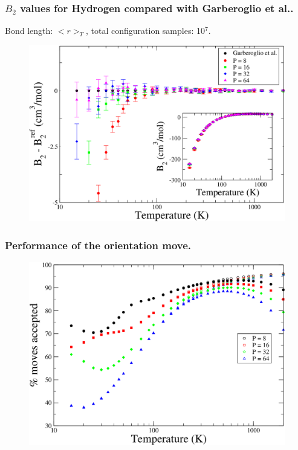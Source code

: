\documentclass[xcolor=svgnames]{beamer}
\begin{document}
            \begin{frame}
                \frametitle{$B_2$ values for Hydrogen compared with Garberoglio et al..}
                \begin{center}Bond length: $< r >_T$, total configuration samples: 10$^7$.\end{center}
                \begin{figure}
                    \centering
                    \includegraphics[scale=0.18,keepaspectratio]{s2GarberoglioAll.png}
                \end{figure}
            \end{frame}
            \begin{frame}
                \frametitle{Performance of the orientation move.}
                \begin{figure}
                    \centering
                    \includegraphics[scale=0.18,keepaspectratio]{s12orAcc.png}
                \end{figure}
            \end{frame}
\end{document}
